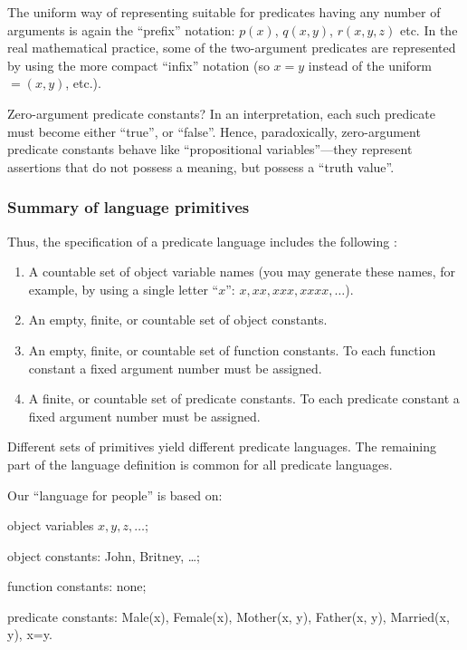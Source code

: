 The uniform way of representing suitable for predicates having any number of arguments is again the ``prefix'' notation: \(p(x)\), \(q(x, y)\), \(r(x, y, z)\) etc.
In the real mathematical practice, some of the two-argument predicates are represented by using the more compact ``infix'' notation (so \(x=y\) instead of the uniform \(=(x, y)\), etc.).

Zero-argument predicate constants?
In an interpretation, each such predicate must become either ``true'', or ``false''.
Hence, paradoxically, zero-argument predicate constants behave like ``propositional variables''---they represent assertions that do not possess a meaning, but possess a ``truth value''.

\subsubsection*{Summary of language primitives}

Thus, the specification of a predicate language includes the following :

\begin{enumerate}
    \item A countable set of object variable names (you may generate these names, for example, by using a single letter ``\(x\)'': \(x, xx, xxx, xxxx, \ldots\)).
    \item An empty, finite, or countable set of object constants.
    \item An empty, finite, or countable set of function constants.
    To each function constant a fixed argument number must be assigned.
    \item A finite, or countable set of predicate constants.
    To each predicate constant a fixed argument number must be assigned.
\end{enumerate}

Different sets of primitives yield different predicate languages. The remaining part of the language definition is common for all predicate languages.

\begin{ex}[]
Our ``language for people'' is based on:
\begin{inparaenum}[(a)]
    \item object variables \(x, y, z, \ldots\);
    \item object constants: John, Britney, \ldots;
    \item function constants: none;
    \item predicate constants: Male(x), Female(x), Mother(x, y), Father(x, y), Married(x, y), x=y.
\end{inparaenum}
\end{ex}

